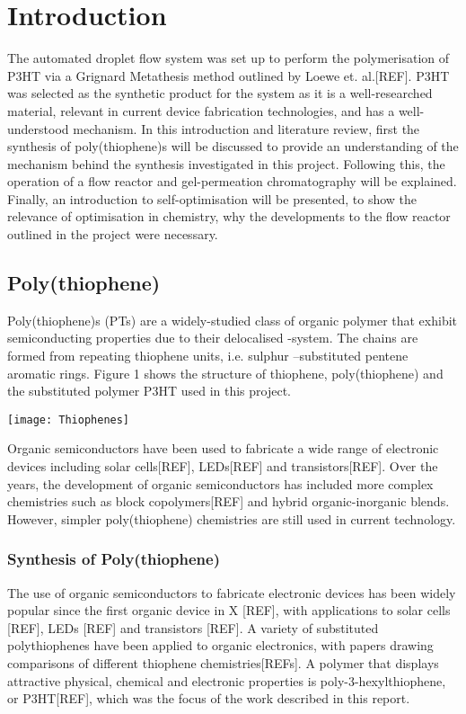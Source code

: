 \chapter{Introduction}

The automated droplet flow system was set up to perform the polymerisation of P3HT via a Grignard Metathesis method outlined by Loewe et. al.[REF]. P3HT was selected as the synthetic product for the system as it is a well-researched material, relevant in current device fabrication technologies, and has a well-understood mechanism. In this introduction and literature review, first the synthesis of poly(thiophene)s will be discussed to provide an understanding of the mechanism behind the synthesis investigated in this project. Following this, the operation of a flow reactor and gel-permeation chromatography will be explained. Finally, an introduction to self-optimisation will be presented, to show the relevance of optimisation in chemistry, why the developments to the flow reactor outlined in the project were necessary.

\section{Poly(thiophene) }
Poly(thiophene)s (PTs) are a widely-studied class of organic polymer that exhibit semiconducting properties due to their delocalised -system. The chains are formed from repeating thiophene units, i.e. sulphur –substituted pentene aromatic rings. Figure 1 shows the structure of thiophene, poly(thiophene) and the substituted polymer P3HT used in this project.

\texttt{[image: Thiophenes]}

Organic semiconductors have been used to fabricate a wide range of electronic devices including solar cells[REF], LEDs[REF] and transistors[REF]. Over the years, the development of organic semiconductors has included more complex chemistries such as block copolymers[REF] and hybrid organic-inorganic blends. However, simpler poly(thiophene) chemistries are still used in current technology.

\subsection{Synthesis of Poly(thiophene)}

The use of organic semiconductors to fabricate electronic devices has been widely popular since the first organic device in X [REF], with applications to solar cells [REF], LEDs [REF] and transistors [REF]. A variety of substituted polythiophenes have been applied to organic electronics, with papers drawing comparisons of different thiophene chemistries[REFs]. A polymer that displays attractive physical, chemical and electronic properties is poly-3-hexylthiophene, or P3HT[REF], which was the focus of the work described in this report. 

